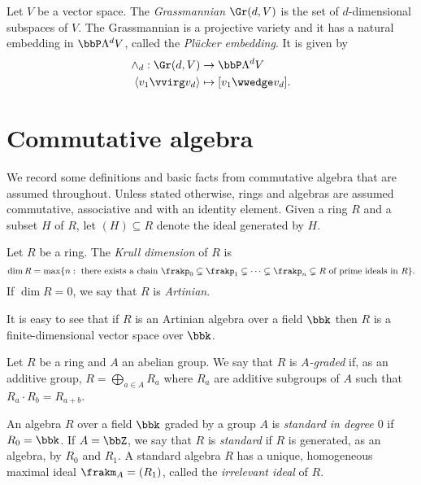 \begin{definition}[Grassmannian]
\label{introduction-definition-Grassmannian}
    Let $V$ be a vector space. The \emph{Grassmannian} $\Gr(d,V)$ is the set of $d$-dimensional subspaces of $V$. The Grassmannian is a projective variety and it has a natural embedding in $\bbP \Lambda^d V$, called the \emph{Pl\"ucker embedding}. It is given by
    \begin{align*}
    \wedge_{d} : \Gr(d,V) &\to \bbP \Lambda^{d}V \\
    \langle v_1 \vvirg v_d \rangle &\mapsto [v_1 \wwedge v_d].
    \end{align*}
\end{definition}    


\section{Commutative algebra}
\label{introduction-section-commutativealgebra}
We record some definitions and basic facts from commutative algebra that are assumed throughout. Unless stated otherwise, rings and algebras are assumed commutative, associative and with an identity element. Given a ring $R$ and a subset $H$ of $R$, let $(H) \subseteq R$ denote the ideal generated by $H$.

\begin{definition}
\label{introduction-definition-Krull}
Let $R$ be a ring. The {\it Krull dimension} of $R$ is 
\[
\dim R = \max \{ n : \text{ there exists a chain $\frakp_0 \subsetneq \frakp_1 \subsetneq \cdots \subsetneq \frakp_n \subsetneq R$ of prime ideals in $R$}\}.
\]
If $\dim R = 0$, we say that $R$ is {\it Artinian}.
\end{definition}
It is easy to see that if $R$ is an Artinian algebra over a field $\bbk$ then $R$ is a finite-dimensional vector space over $\bbk$. 

\begin{definition}
\label{introduction-definition-graded}
Let $R$ be a ring and $A$ an abelian group. We say that $R$ is {\it $A$-graded} if, as an additive group, $R = \bigoplus_{a \in A} R_a$ where $R_a$ are additive subgroups of $A$ such that $R_a \cdot R_b = R_{a + b}$.

An algebra $R$ over a field $\bbk$ graded by a group $A$ is {\it standard in degree $0$} if $R_0 = \bbk$. If $A = \bbZ$, we say that $R$ is {\it standard} if $R$ is generated, as an algebra, by $R_0$ and $R_1$. A standard algebra $R$ has a unique, homogeneous maximal ideal $\frakm_A = (R_1)$, called the {\it irrelevant ideal} of $R$.
\end{definition}

